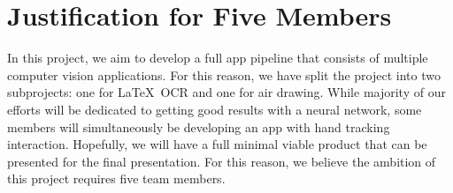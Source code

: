 \section{Justification for Five Members}
\label{sec:justification}
In this project, we aim to develop a full app pipeline that consists of multiple computer vision applications. For this reason, we have split the project into two subprojects: one for \LaTeX\ OCR and one for air drawing. While majority of our efforts will be dedicated to getting good results with a neural network, some members will simultaneously be developing an app with hand tracking interaction. Hopefully, we will have a full minimal viable product that can be presented for the final presentation. For this reason, we believe the ambition of this project requires five team members. 